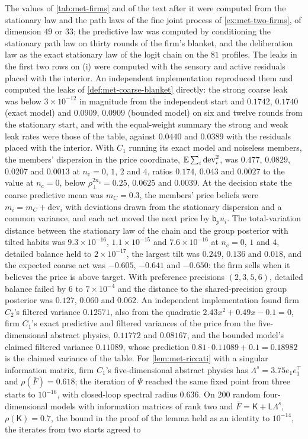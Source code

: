 \begin{numcheck}\label{chk:met-two-firms}
The values of \cref{tab:met-firms} and of the text after it were computed from the stationary law and the path laws of the fine joint process of \cref{ex:met-two-firms}, of dimension $49$ or $33$; the predictive law was computed by conditioning the stationary path law on thirty rounds of the firm's blanket, and the deliberation law as the exact stationary law of the logit chain on the $81$ profiles. The leaks in the first two rows on (i) were computed with the sensory and active residuals placed with the interior. An independent implementation reproduced them and computed the leaks of \cref{def:met-coarse-blanket} directly: the strong coarse leak was below $3\times10^{-12}$ in magnitude from the independent start and $0.1742$, $0.1740$ (exact model) and $0.0909$, $0.0909$ (bounded model) on six and twelve rounds from the stationary start, and with the equal-weight summary the strong and weak leak rates were those of the table, against $0.0440$ and $0.0389$ with the residuals placed with the interior. With $C_1$ running its exact model and noiseless members, the members' dispersion in the price coordinate, $\mathbb{E}\sum_i\mathrm{dev}_i^2$, was $0.477$, $0.0829$, $0.0207$ and $0.0013$ at $n_{\mathrm c}=0$, $1$, $2$ and $4$, ratios $0.174$, $0.043$ and $0.0027$ to the value at $n_{\mathrm c}=0$, below $\rho_\perp^{2n_{\mathrm c}}=0.25$, $0.0625$ and $0.0039$. At the decision state the coarse predictive mean was $m_C=0.3$, the members' price beliefs were $m_i=m_C+\mathrm{dev}_i$ with deviations drawn from the stationary dispersion and a common variance, and each act moved the next price by $\mathsf b_pu_i$. The total-variation distance between the stationary law of the chain and the group posterior with tilted habits was $9.3\times10^{-16}$, $1.1\times10^{-15}$ and $7.6\times10^{-16}$ at $n_{\mathrm c}=0$, $1$ and $4$, detailed balance held to $2\times10^{-17}$, the largest tilt was $0.249$, $0.136$ and $0.018$, and the expected coarse act was $-0.605$, $-0.641$ and $-0.650$: the firm sells when it believes the price is above target. With preference precisions $(2,3,5,6)$, detailed balance failed by $6$ to $7\times10^{-4}$ and the distance to the shared-precision group posterior was $0.127$, $0.060$ and $0.062$. An independent implementation found firm $C_2$'s filtered variance $0.12571$, also from the quadratic $2.43x^2+0.49x-0.1=0$, firm $C_1$'s exact predictive and filtered variances of the price from the five-dimensional abstract physics, $0.11772$ and $0.08167$, and the bounded model's claimed filtered variance $0.11089$, whose prediction $0.81\cdot0.11089+0.1=0.18982$ is the claimed variance of the table. For \cref{lem:met-riccati} with a singular information matrix, firm $C_1$'s five-dimensional abstract physics has $\Lambda^s=3.75e_1e_1^\top$ and $\rho(\bar F)=0.618$; the iteration of $\Psi$ reached the same fixed point from three starts to $10^{-16}$, with closed-loop spectral radius $0.636$. On $200$ random four-dimensional models with information matrices of rank two and $\bar F=\mathsf K+\mathsf L\Lambda^s$, $\rho(\mathsf K)=0.7$, the bound in the proof of the lemma held as an identity to $10^{-14}$, the iterates from two starts agreed to 
\end{numcheck}
